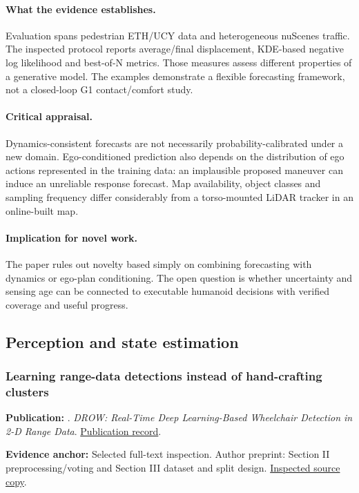\paragraph{What the evidence establishes.} Evaluation spans pedestrian ETH/UCY data and heterogeneous nuScenes traffic. The inspected protocol reports average/final displacement, KDE-based negative log likelihood and best-of-N metrics. Those measures assess different properties of a generative model. The examples demonstrate a flexible forecasting framework, not a closed-loop G1 contact/comfort study.

\paragraph{Critical appraisal.} Dynamics-consistent forecasts are not necessarily probability-calibrated under a new domain. Ego-conditioned prediction also depends on the distribution of ego actions represented in the training data: an implausible proposed maneuver can induce an unreliable response forecast. Map availability, object classes and sampling frequency differ considerably from a torso-mounted LiDAR tracker in an online-built map.

\paragraph{Implication for novel work.} The paper rules out novelty based simply on combining forecasting with dynamics or ego-plan conditioning. The open question is whether uncertainty and sensing age can be connected to executable humanoid decisions with verified coverage and useful progress.

\subsection{Perception and state estimation}
\subsubsection{Learning range-data detections instead of hand-crafting clusters}\label{paper:drow}
\textbf{Publication:} \citet{drow}. \emph{DROW: Real-Time Deep Learning-Based Wheelchair Detection in 2-D Range Data}. \href{https://doi.org/10.1109/lra.2016.2645131}{Publication record}.

\textbf{Evidence anchor:} Selected full-text inspection. Author preprint: Section II preprocessing/voting and Section III dataset and split design. \href{https://arxiv.org/pdf/1603.02636}{Inspected source copy}.

